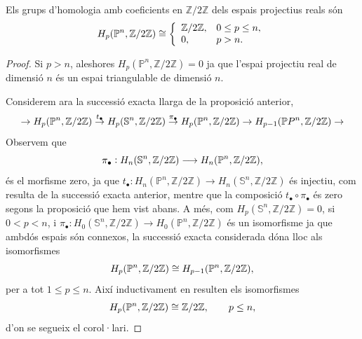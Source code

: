 \documentclass[../main.tex]{subfiles}
\begin{document}
\begin{coro}
Els grups d'homologia amb coeficients en $\mathbb{Z}/2\mathbb{Z}$ dels espais projectius reals són
\begin{equation}
    \notag
    H_p(\mathbb{P}^n,\mathbb{Z}/2\mathbb{Z})\cong\left\{
    \begin{array}{ll}
        \mathbb{Z}/2\mathbb{Z},  & 0\leq p\leq n, \\
        0, & p>n.
    \end{array}
    \right.
\end{equation}
\end{coro}
\begin{proof}
Si $p>n$, aleshores $H_p(\mathbb{P}^n,\mathbb{Z}/2\mathbb{Z}) = 0$ ja que l'espai projectiu real de dimensió $n$ és un espai triangulable de dimensió $n$.

Considerem ara la successió exacta llarga de la proposició anterior,
\begin{equation}
    \notag
    \rightarrow H_p(\mathbb{P}^n,\mathbb{Z}/2\mathbb{Z})\overset{t_\bullet}{\rightarrow}H_p(\mathbb{S}^n,\mathbb{Z}/2\mathbb{Z})\overset{\pi_\bullet}{\rightarrow}H_p(\mathbb{P}^n,\mathbb{Z}/2\mathbb{Z})\rightarrow H_{p-1}(\mathbb{P}P^n,\mathbb{Z}/2\mathbb{Z})\rightarrow
\end{equation}
Observem que 
\begin{equation}
    \notag
    \pi_\bullet:H_n(\mathbb{S}^n,\mathbb{Z}/2\mathbb{Z})\longrightarrow H_n(\mathbb{P}^n,\mathbb{Z}/2\mathbb{Z}),
\end{equation}
és el morfisme zero, ja que $t_\bullet:H_n(\mathbb{P}^n,\mathbb{Z}/2\mathbb{Z})\rightarrow H_n(\mathbb{S}^n,\mathbb{Z}/2\mathbb{Z})$ és injectiu, com resulta de la successió exacta anterior, mentre que la composició $t_\bullet\circ\pi_\bullet$ és zero segons la proposició que hem vist abans. A més, com $H_p(\mathbb{S}^n,\mathbb{Z}/2\mathbb{Z})=0$, si $0<p<n$, i $\pi_\bullet:H_0(\mathbb{S}^n,\mathbb{Z}/2\mathbb{Z})\rightarrow H_0(\mathbb{P}^n,\mathbb{Z}/2\mathbb{Z})$ és un isomorfisme ja que ambdós espais són connexos, la successió exacta considerada dóna lloc als isomorfismes
\begin{equation}
    \notag
    H_p(\mathbb{P}^n,\mathbb{Z}/2\mathbb{Z})\cong H_{p-1}(\mathbb{P}^n,\mathbb{Z}/2\mathbb{Z}),
\end{equation}
per a tot $1\leq p\leq n$. Així inductivament en resulten els isomorfismes 
\begin{equation}
    \notag
    H_p(\mathbb{P}^n,\mathbb{Z}/2\mathbb{Z})\cong\mathbb{Z}/2\mathbb{Z},\qquad p\leq n,
\end{equation}
d'on se segueix el corol·lari.
\end{proof}
\end{document}

